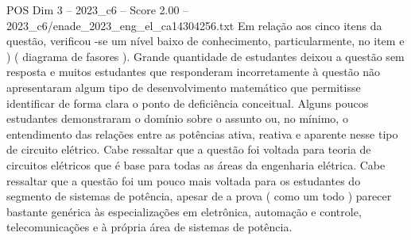 \begin{textsample}{POS Dim 3 – 2023\_c6 – Score 2.00 – 2023\_c6/enade\_2023\_eng\_el\_ca14304256.txt}
Em relação aos cinco itens da questão, verificou -se um nível baixo de conhecimento, particularmente, no item e ) ( diagrama de fasores ).
Grande quantidade de estudantes deixou a questão sem resposta e muitos estudantes que responderam incorretamente à questão não apresentaram algum tipo de desenvolvimento matemático que permitisse identificar de forma clara o ponto de deficiência conceitual.
Alguns poucos estudantes demonstraram o domínio sobre o assunto ou, no mínimo, o entendimento das relações entre as potências ativa, reativa e aparente nesse tipo de circuito elétrico.
Cabe ressaltar que a questão foi voltada para teoria de circuitos elétricos que é base para todas as áreas da engenharia elétrica.
Cabe ressaltar que a questão foi um pouco mais voltada para os estudantes do segmento de sistemas de potência, apesar de a prova ( como um todo ) parecer bastante genérica às especializações em eletrônica, automação e controle, telecomunicações e à própria área de sistemas de potência.

\end{textsample}
